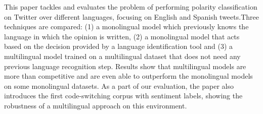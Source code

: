 This paper tackles and evaluates the problem of performing polarity classification on Twitter over different languages, focusing on English and Spanish tweets.Three techniques are compared: (1) a monolingual model which previously knows the language in which the opinion is written, (2) a monolingual model that acts based on the decision provided by a language identification tool and (3) a multilingual model trained on a multilingual dataset that does not need any previous language recognition step. Results show that multilingual models are more than competitive and are even able to outperform the monolingual models on some monolingual datasets. As a part of our evaluation, the paper also introduces the first code-switching corpus with sentiment labels, showing the robustness of a multilingual approach on this environment.

